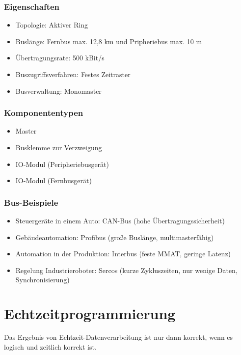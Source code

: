 \subsubsection{Eigenschaften}
\begin{itemize}
	\item Topologie: Aktiver Ring
	\item Buslänge: Fernbus max. 12,8 km und Pripheriebus max. 10 m
	\item Übertragungsrate: 500 kBit/s
	\item Buszugriffsverfahren: Festes Zeitraster
	\item Busverwaltung: Monomaster
\end{itemize}

\subsubsection{Komponententypen}
\begin{itemize}
	\item Master
	\item Busklemme zur Verzweigung
	\item IO-Modul (Peripheriebusgerät)
	\item IO-Modul (Fernbusgerät)
\end{itemize}

\subsubsection{Bus-Beispiele}
\begin{itemize}
	\item Steuergeräte in einem Auto: CAN-Bus (hohe Übertragungssicherheit)
	\item Gebäudeautomation: Profibus (große Buslänge, multimasterfähig)
	\item Automation in der Produktion: Interbus (feste MMAT, geringe Latenz)
	\item Regelung Industrieroboter: Sercos (kurze Zykluszeiten, nur wenige Daten, Synchronisierung)
\end{itemize}



\section{Echtzeitprogrammierung}
Das Ergebnis von Echtzeit-Datenverarbeitung ist nur dann korrekt, wenn es logisch und zeitlich korrekt ist.


